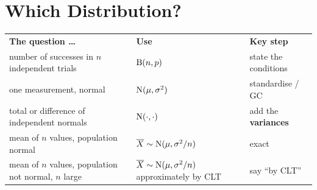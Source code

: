 \section{Which Distribution?}
\begin{center}\ba\small
\begin{tabular}{|L{6.3cm}|L{3.4cm}|L{5.5cm}|}\hline
\textbf{The question \ldots} & \textbf{Use} & \textbf{Key step}\\\Xhline{2pt}
number of successes in $n$ independent trials & $\mathrm{B}(n,p)$ & state the conditions\\\hline
one measurement, normal & $\mathrm{N}(\mu,\sigma^{2})$ & standardise / GC\\\hline
total or difference of independent normals & $\mathrm{N}(\cdot,\cdot)$ & add the \textbf{variances}\\\hline
mean of $n$ values, population normal & $\overline{X}\sim\mathrm{N}(\mu,\sigma^{2}/n)$ & exact\\\hline
mean of $n$ values, population not normal, $n$ large & $\overline{X}\sim\mathrm{N}(\mu,\sigma^{2}/n)$ approximately by CLT & say ``by CLT''\\\hline
\end{tabular}\end{center}
